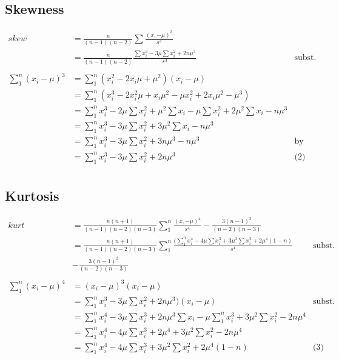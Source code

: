 \documentclass[11pt]{article} %
\begin{document}
\subsection{Skewness}
\begin{align*}
skew &= \frac{n}{(n-1)(n-2)}\sum\frac{(x,-\mu)^3}{s^3} \\
        &= \frac{n}{(n-1)(n-2)}\frac{\sum x_i^3 - 3\mu\sum x_i^2 + 2n\mu^3}{s^3} & \text{subst. (2)}\\
\\
\sum_1^n {(x_i - \mu)^3} &= \sum_1^n (x_i^2 - 2x_i\mu + \mu^2)(x_i - \mu) \\
                                &= \sum_1^n (x_i^3 - 2x_i^2\mu + x_i\mu^2 - \mu x_i^2 + 2x_i\mu^2 - \mu^3) \\
                                &= \sum_1^n x_i^3 - 2\mu\sum x_i^2 + \mu^2\sum x_i - \mu\sum x_i^2 + 2\mu^2\sum x_i - n\mu^3 \\
                                &= \sum_1^n x_i^3 - 3\mu\sum x_i^2 + 3\mu^2\sum x_i - n\mu^3 \\
                                &= \sum_1^n x_i^3 - 3\mu\sum x_i^2 + 3n\mu^3 - n\mu^3 & \text{by (1)} \\
                                &= \sum_1^n x_i^3 - 3\mu\sum x_i^2 + 2n\mu^3 & \text{(2)} \\
\end{align*}

\subsection{Kurtosis}
\begin{align*}
kurt &= \frac{n(n+1)}{(n-1)(n-2)(n-3)}\sum_1^n\frac{(x,-\mu)^4}{s^4} - \frac{3(n-1)^2}{(n-2)(n-3)}\\
      &= \frac{n(n+1)}{(n-1)(n-2)(n-3)}\sum_1^n\frac{(\sum_1^n x_i^4 - 4\mu\sum x_i^3 + 3\mu^2\sum x_i^2 + 2\mu^4(1-n) }{s^4} & \text{subst. (3)}\\
      & - \frac{3(n-1)^2}{(n-2)(n-3)} \\
\\
\sum_1^n {(x_i - \mu)^4} &= (x_i - \mu)^3(x_i - \mu) \\
                                &= \sum_1^n x_i^3 - 3\mu\sum x_i^2 + 2n\mu^3)(x_i - \mu) & \text{subst. (2)}\\
                                &= \sum_1^n x_i^4 - 3\mu\sum x_i^3 + 2n\mu^3\sum x_i  - \mu \sum_1^n x_i^3 + 3\mu^2\sum x_i^2 - 2n\mu^4 \\
                                &= \sum_1^n x_i^4 - 4\mu\sum x_i^3 + 2\mu^4 + 3\mu^2\sum x_i^2 - 2n\mu^4 \\
                                &= \sum_1^n x_i^4 - 4\mu\sum x_i^3 + 3\mu^2\sum x_i^2 + 2\mu^4(1-n) & \text{(3)}
\end{align*}
\end{document}
